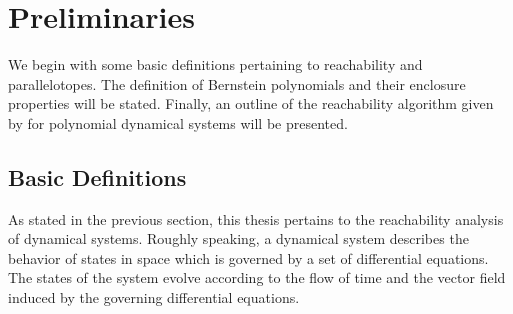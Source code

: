 \chapter{Preliminaries}
\label{chap:prelim}

We begin with some basic definitions pertaining to reachability and parallelotopes. The definition of Bernstein polynomials and their enclosure properties will be stated. Finally, an outline of the reachability algorithm given by \cite{dreossi2016parallelotope} for polynomial dynamical systems will be presented.

\section{Basic Definitions}
\label{sec:definitions}

As stated in the previous section, this thesis pertains to the reachability analysis of dynamical systems. Roughly speaking, a dynamical system describes the behavior of states in space which is governed by a set of differential equations. The states of the system evolve according to the flow of time and the vector field induced by the governing differential equations.

